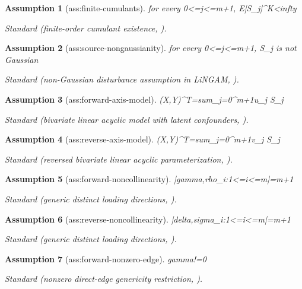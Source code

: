 \documentclass{article}
\newtheorem{assumption}{Assumption}
\begin{document}
\begin{assumption}[ass:finite-cumulants]\label{ass:finite-cumulants}
for every 0<=j<=m+1, E|S_j|^K<infty
\par\smallskip\noindent\emph{Standard} (finite-order cumulant existence, \cite{ChenPengHuangEtAl2025Direction}).
\end{assumption}

\begin{assumption}[ass:source-nongaussianity]\label{ass:source-nongaussianity}
for every 0<=j<=m+1, S_j is not Gaussian
\par\smallskip\noindent\emph{Standard} (non-Gaussian disturbance assumption in LiNGAM, \cite{ChenPengHuangEtAl2025Direction}).
\end{assumption}

\begin{assumption}[ass:forward-axis-model]\label{ass:forward-axis-model}
(X,Y)^T=sum_{j=0}^{m+1}u_j S_j
\par\smallskip\noindent\emph{Standard} (bivariate linear acyclic model with latent confounders, \cite{ChenPengHuangEtAl2025Direction}).
\end{assumption}

\begin{assumption}[ass:reverse-axis-model]\label{ass:reverse-axis-model}
(X,Y)^T=sum_{j=0}^{m+1}v_j S_j
\par\smallskip\noindent\emph{Standard} (reversed bivariate linear acyclic parameterization, \cite{ChenPengHuangEtAl2025Direction}).
\end{assumption}

\begin{assumption}[ass:forward-noncollinearity]\label{ass:forward-noncollinearity}
|{gamma,rho_i:1<=i<=m}|=m+1
\par\smallskip\noindent\emph{Standard} (generic distinct loading directions, \cite{SchkodaRobevaDrton2024}).
\end{assumption}

\begin{assumption}[ass:reverse-noncollinearity]\label{ass:reverse-noncollinearity}
|{delta,sigma_i:1<=i<=m}|=m+1
\par\smallskip\noindent\emph{Standard} (generic distinct loading directions, \cite{SchkodaRobevaDrton2024}).
\end{assumption}

\begin{assumption}[ass:forward-nonzero-edge]\label{ass:forward-nonzero-edge}
gamma!=0
\par\smallskip\noindent\emph{Standard} (nonzero direct-edge genericity restriction, \cite{ChenPengHuangEtAl2025Direction}).
\end{assumption}
\end{document}
